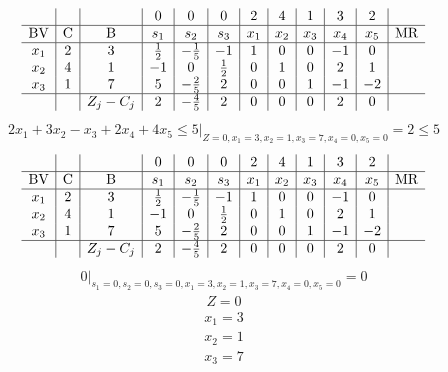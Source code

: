\documentclass{article}
\begin{document}
\begin{align*}
\begin{array}{c|c|c|c|c|c|c|c|c|c|c|c}
 &  &  & 0 & 0 & 0 & 2 & 4 & 1 & 3 & 2 & \\
\hline
\text{BV} & \text{C} & \text{B} & s_{1} & s_{2} & s_{3} & x_{1} & x_{2} & x_{3} & x_{4} & x_{5} & \text{MR} \\
\hline
x_{1} & 2 & 3 & \frac{1}{2} & -\frac{1}{5} & -1 & 1 & 0 & 0 & -1 & 0 \\
x_{2} & 4 & 1 & -1 & 0 & \frac{1}{2} & 0 & 1 & 0 & 2 & 1 \\
x_{3} & 1 & 7 & 5 & -\frac{2}{5} & 2 & 0 & 0 & 1 & -1 & -2 \\
\hline
 &  & Z_j-C_j & 2 & -\frac{4}{5} & 2 & 0 & 0 & 0 & 2 & 0 & \\
\end{array}
\end{align*}
\begin{align*}
\left.2x_{1} + 3x_{2} - x_{3} + 2x_{4} + 4x_{5}\le5\right|_{Z=0,x_{1}=3,x_{2}=1,x_{3}=7,x_{4}=0,x_{5}=0}=2\le5\end{align*}
\begin{align*}
\begin{array}{c|c|c|c|c|c|c|c|c|c|c|c}
 &  &  & 0 & 0 & 0 & 2 & 4 & 1 & 3 & 2 & \\
\hline
\text{BV} & \text{C} & \text{B} & s_{1} & s_{2} & s_{3} & x_{1} & x_{2} & x_{3} & x_{4} & x_{5} & \text{MR} \\
\hline
x_{1} & 2 & 3 & \frac{1}{2} & -\frac{1}{5} & -1 & 1 & 0 & 0 & -1 & 0 \\
x_{2} & 4 & 1 & -1 & 0 & \frac{1}{2} & 0 & 1 & 0 & 2 & 1 \\
x_{3} & 1 & 7 & 5 & -\frac{2}{5} & 2 & 0 & 0 & 1 & -1 & -2 \\
\hline
 &  & Z_j-C_j & 2 & -\frac{4}{5} & 2 & 0 & 0 & 0 & 2 & 0 & \\
\end{array}
\end{align*}
\begin{align*}
\left.0\right|_{s_{1}=0,s_{2}=0,s_{3}=0,x_{1}=3,x_{2}=1,x_{3}=7,x_{4}=0,x_{5}=0}=0\end{align*}
\begin{align*}
Z=0\end{align*}
\begin{align*}
x_{1}=3\end{align*}
\begin{align*}
x_{2}=1\end{align*}
\begin{align*}
x_{3}=7\end{align*}
\end{document}
